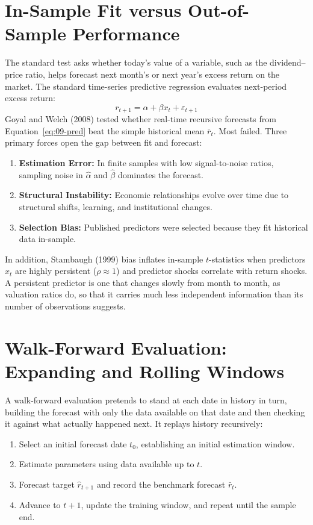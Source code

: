 \section{In-Sample Fit versus Out-of-Sample Performance}
\label{sec:09-insample}

The standard test asks whether today's value of a variable, such as the dividend--price ratio, helps forecast next month's or next year's excess return on the market. The standard time-series predictive regression evaluates next-period excess return:
\begin{equation}
  r_{t+1} = \alpha + \beta x_t + \varepsilon_{t+1}
  \label{eq:09-pred}
\end{equation}
Goyal and Welch (2008) tested whether real-time recursive forecasts from Equation~\eqref{eq:09-pred} beat the simple historical mean $\bar{r}_t$. Most failed. Three primary forces open the gap between fit and forecast:
\begin{enumerate}
  \item \textbf{Estimation Error:} In finite samples with low signal-to-noise ratios, sampling noise in $\hat{\alpha}$ and $\hat{\beta}$ dominates the forecast.
  \item \textbf{Structural Instability:} Economic relationships evolve over time due to structural shifts, learning, and institutional changes.
  \item \textbf{Selection Bias:} Published predictors were selected because they fit historical data in-sample.
\end{enumerate}
In addition, Stambaugh (1999) bias inflates in-sample $t$-statistics when predictors $x_t$ are highly persistent ($\rho \approx 1$) and predictor shocks correlate with return shocks. A persistent predictor is one that changes slowly from month to month, as valuation ratios do, so that it carries much less independent information than its number of observations suggests.


\section{Walk-Forward Evaluation: Expanding and Rolling Windows}
\label{sec:09-walkforward}

A walk-forward evaluation pretends to stand at each date in history in turn, building the forecast with only the data available on that date and then checking it against what actually happened next. It replays history recursively:
\begin{enumerate}
  \item Select an initial forecast date $t_0$, establishing an initial estimation window.
  \item Estimate parameters using data available up to $t$.
  \item Forecast target $\hat{r}_{t+1}$ and record the benchmark forecast $\bar{r}_t$.
  \item Advance to $t+1$, update the training window, and repeat until the sample end.
\end{enumerate}

